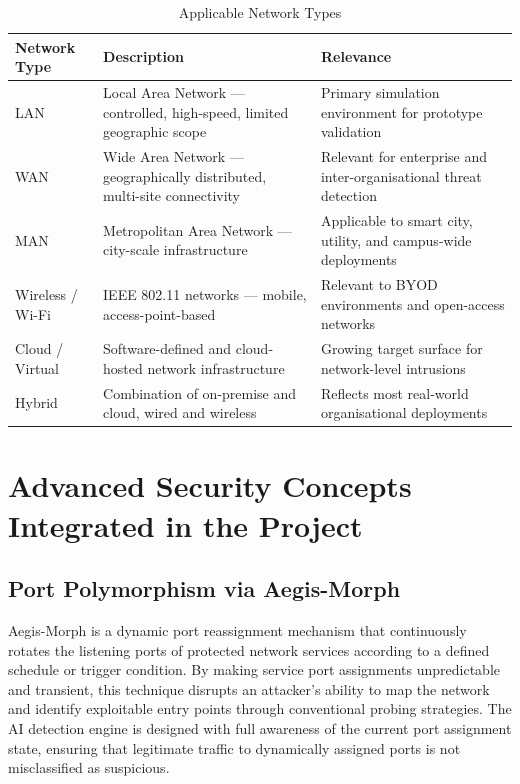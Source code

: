 \documentclass[12pt,a4paper]{report}
\begin{document}
\begin{table}[h!]
\centering
\caption{Applicable Network Types}
\begin{tabular}{@{}L{3cm} L{5.5cm} L{5.5cm}@{}}
  \toprule
  \textbf{Network Type} & \textbf{Description} & \textbf{Relevance} \\
  \midrule
  LAN
    & Local Area Network --- controlled, high-speed, limited geographic scope
    & Primary simulation environment for prototype validation \\
  \addlinespace
  WAN
    & Wide Area Network --- geographically distributed, multi-site connectivity
    & Relevant for enterprise and inter-organisational threat detection \\
  \addlinespace
  MAN
    & Metropolitan Area Network --- city-scale infrastructure
    & Applicable to smart city, utility, and campus-wide deployments \\
  \addlinespace
  Wireless / Wi-Fi
    & IEEE 802.11 networks --- mobile, access-point-based
    & Relevant to BYOD environments and open-access networks \\
  \addlinespace
  Cloud / Virtual
    & Software-defined and cloud-hosted network infrastructure
    & Growing target surface for network-level intrusions \\
  \addlinespace
  Hybrid
    & Combination of on-premise and cloud, wired and wireless
    & Reflects most real-world organisational deployments \\
  \bottomrule
\end{tabular}
\label{tab:network-scope}
\end{table}

\chapter{Advanced Security Concepts Integrated in the Project}

\section{Port Polymorphism via Aegis-Morph}

Aegis-Morph is a dynamic port reassignment mechanism that continuously rotates the
listening ports of protected network services according to a defined schedule or trigger
condition. By making service port assignments unpredictable and transient, this technique
disrupts an attacker's ability to map the network and identify exploitable entry points through
conventional probing strategies. The AI detection engine is designed with full awareness of the
current port assignment state, ensuring that legitimate traffic to dynamically assigned ports is
not misclassified as suspicious.
\end{document}
